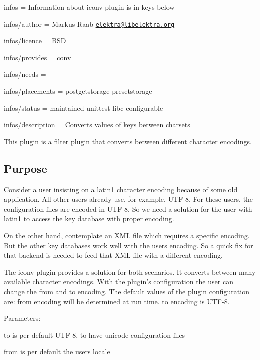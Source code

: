 
\begin{DoxyItemize}
\item infos = Information about iconv plugin is in keys below
\item infos/author = Markus Raab \href{mailto:elektra@libelektra.org}{\tt elektra@libelektra.\+org}
\item infos/licence = B\+S\+D
\item infos/provides = conv
\item infos/needs =
\item infos/placements = postgetstorage presetstorage
\item infos/status = maintained unittest libc configurable
\item infos/description = Converts values of keys between charsets
\end{DoxyItemize}

This plugin is a filter plugin that converts between different character encodings.

\subsection*{Purpose}

Consider a user insisting on a {\ttfamily latin1} character encoding because of some old application. All other users already use, for example, {\ttfamily U\+T\+F-\/8}. For these users, the configuration files are encoded in {\ttfamily U\+T\+F-\/8}. So we need a solution for the user with {\ttfamily latin1} to access the key database with proper encoding.

On the other hand, contemplate an X\+M\+L file which requires a specific encoding. But the other key databases work well with the users encoding. So a quick fix for that backend is needed to feed that X\+M\+L file with a different encoding.

The iconv plugin provides a solution for both scenarios. It converts between many available character encodings. With the plugin’s configuration the user can change the from and to encoding. The default values of the plugin configuration are\+: {\ttfamily from} encoding will be determined at run time. {\ttfamily to} encoding is {\ttfamily U\+T\+F-\/8}.

Parameters\+:
\begin{DoxyItemize}
\item {\ttfamily to} is per default U\+T\+F-\/8, to have unicode configuration files
\item {\ttfamily from} is per default the users locale
\end{DoxyItemize}


